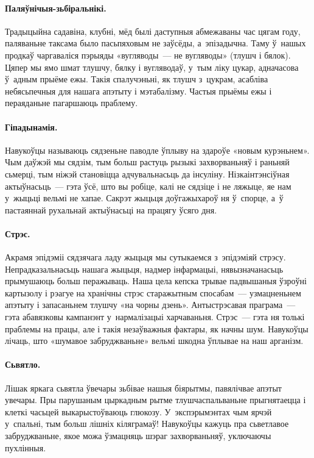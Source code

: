\paragraph{Паляўнічыя-зьбіральнікі.}
Традыцыйна садавіна, клубні, мёд былі даступныя абмежаваны час цягам году, паляваньне таксама было пасьпяховым не заўсёды, а~эпізадычна. Таму ў~нашых продкаў чаргаваліся пэрыяды «вугляводы~--- не вугляводы» (тлушч і бялок). Цяпер мы ямо шмат тлушчу, бялку і вугляводаў, у~тым ліку цукар, адначасова ў~адным прыёме ежы. Такія спалучэньні, як тлушч з~цукрам, асабліва небясьпечныя для нашага апэтыту і мэтабалізму. Частыя прыёмы ежы і пераяданьне пагаршаюць праблему.

\paragraph{Гіпадынамія.}
Навукоўцы называюць сядзеньне паводле ўплыву на здароўе «новым курэньнем». Чым даўжэй мы сядзім, тым больш растуць рызыкі захворваньняў і раньняй сьмерці, тым ніжэй становіцца адчувальнасьць да інсуліну. Нізкаінтэнсіўная актыўнасьць~--- гэта ўсё, што вы робіце, калі не сядзіце і не ляжыце, яе нам у~жыцьці вельмі не хапае. Сакрэт жыцьця доўгажыхароў ня ў~спорце, а~ў пастаяннай рухальнай актыўнасьці на працягу ўсяго дня.

\paragraph{Стрэс.}
Акрамя эпідэміі сядзячага ладу жыцьця мы сутыкаемся з~эпідэміяй стрэсу. Непрадказальнасьць нашага жыцьця, надмер інфармацыі, нявызначанасьць прымушаюць больш перажываць. Наша цела кепска трывае падвышаныя ўзроўні картызолу і рэагуе на хранічны стрэс старажытным спосабам~--- узмацненьнем апэтыту і запасаньнем тлушчу «на чорны дзень». Антыстрэсавая праграма~--- гэта абавязковы кампанэнт у~нармалізацыі харчаваньня. Стрэс~--- гэта ня толькі праблемы на працы, але і такія незаўважныя фактары, як начны шум. Навукоўцы лічаць, што «шумавое забруджваньне» вельмі шкодна ўплывае на наш арганізм.

\paragraph{Сьвятло.}
Лішак яркага сьвятла ўвечары зьбівае нашыя біярытмы, павялічвае апэтыт увечары. Пры парушаным цыркадным рытме тлушчаспальваньне прыгнятаецца і клеткі часьцей выкарыстоўваюць глюкозу. У~экспэрымэнтах чым ярчэй у~спальні, тым больш лішніх кіляграмаў! Навукоўцы кажуць пра сьветлавое забруджваньне, якое можа ўзмацняць шэраг захворваньняў, уключаючы пухлінныя.

